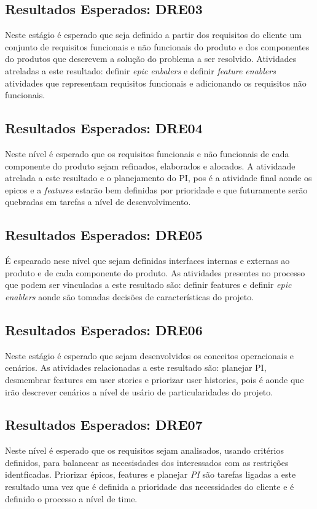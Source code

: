 	\subsection{Resultados Esperados: DRE03}
	Neste estágio é esperado que seja definido a partir dos requisitos do cliente um conjunto de requisitos funcionais e não funcionais do produto e dos componentes do produtos que descrevem a solução do problema a ser resolvido. Atividades atreladas a este resultado: definir {\itshape epic enbalers} e definir {\itshape feature enablers} atividades que representam requisitos funcionais e adicionando os requisitos não funcionais.

	\subsection{Resultados Esperados: DRE04}
	Neste nível é esperado que os requisitos funcionais e não funcionais de cada componente do produto sejam refinados, elaborados e alocados. A atividaade atrelada a este resultado e o planejamento do {\itshape} PI, pos é a atividade final aonde os epicos e a {\itshape features} estarão bem definidas por prioridade e que futuramente serão quebradas em tarefas a nível de desenvolvimento.

	\subsection{Resultados Esperados: DRE05}
	É espearado nese nível que sejam definidas interfaces internas e externas ao produto e de cada componente do produto. As atividades presentes no processo que podem ser vinculadas a este resultado são: definir features e definir {\itshape epic enablers} aonde são tomadas decisões de características do projeto. 

	\subsection{Resultados Esperados: DRE06}
	Neste estágio é esperado que sejam desenvolvidos os conceitos operacionais e cenários. As atividades relacionadas a este resultado são: planejar {\itshape} PI, desmembrar features em user stories e priorizar user histories, pois é aonde que irão descrever cenários a nível de usário de particularidades do projeto.

	\subsection{Resultados Esperados: DRE07}
	Neste nível é esperado que os requisitos sejam analisados, usando critérios definidos, para balancear as necesisdades dos interessados com as restrições identficadas. Priorizar épicos, features e planejar {\itshape PI} são tarefas ligadas a este resultado uma vez que é definida a prioridade das necessidades do cliente e é definido o processo a nível de time.

